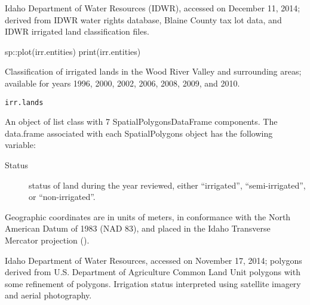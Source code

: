 \documentclass[a4paper]{book}
\begin{document}
%
\begin{Source}\relax
Idaho Department of Water Resources (IDWR), accessed on December 11, 2014;
derived from IDWR water rights database, Blaine County tax lot data,
and IDWR irrigated land classification files.
\end{Source}
%
\begin{Examples}
\begin{ExampleCode}
sp::plot(irr.entities)
print(irr.entities)

\end{ExampleCode}
\end{Examples}
%
\begin{Description}\relax
Classification of irrigated lands in the Wood River Valley and surrounding areas;
available for years 1996, 2000, 2002, 2006, 2008, 2009, and 2010.
\end{Description}
%
\begin{Usage}
\begin{verbatim}
irr.lands
\end{verbatim}
\end{Usage}
%
\begin{Format}
An object of list class with 7 SpatialPolygonsDataFrame components.
The data.frame associated with each SpatialPolygons object has the following variable:
\begin{description}

\item[Status] status of land during the year reviewed,
either ``irrigated'', ``semi-irrigated'', or ``non-irrigated''.

\end{description}

Geographic coordinates are in units of meters, in conformance with the
North American Datum of 1983 (NAD 83), and placed in the
Idaho Transverse Mercator projection ().
\end{Format}
%
\begin{Source}\relax
Idaho Department of Water Resources, accessed on November 17, 2014;
polygons derived from U.S. Department of Agriculture Common Land Unit polygons
with some refinement of polygons.
Irrigation status interpreted using satellite imagery and aerial photography.
\end{Source}
%
\begin{SeeAlso}\relax
{}
\end{SeeAlso}
\end{document}
